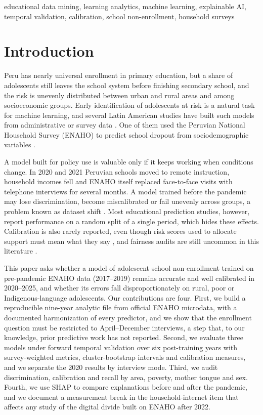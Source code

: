 \documentclass[conference]{IEEEtran}
\begin{document}
\begin{IEEEkeywords}
educational data mining, learning analytics, machine learning, explainable AI, temporal validation, calibration, school non-enrollment, household surveys
\end{IEEEkeywords}

\section{Introduction}

Peru has nearly universal enrollment in primary education, but a share of adolescents still leaves the school system before finishing secondary school, and the risk is unevenly distributed between urban and rural areas and among socioeconomic groups. Early identification of adolescents at risk is a natural task for machine learning, and several Latin American studies have built such models from administrative or survey data \cite{rodriguez2023,jacha2024,jimenez2024}. One of them used the Peruvian National Household Survey (ENAHO) to predict school dropout from sociodemographic variables \cite{jacha2024}.

A model built for policy use is valuable only if it keeps working when conditions change. In 2020 and 2021 Peruvian schools moved to remote instruction, household incomes fell and ENAHO itself replaced face-to-face visits with telephone interviews for several months. A model trained before the pandemic may lose discrimination, become miscalibrated or fail unevenly across groups, a problem known as dataset shift \cite{moreno2012}. Most educational prediction studies, however, report performance on a random split of a single period, which hides these effects. Calibration is also rarely reported, even though risk scores used to allocate support must mean what they say \cite{vancalster2019}, and fairness audits are still uncommon in this literature \cite{baker2022}.

This paper asks whether a model of adolescent school non-enrollment trained on pre-pandemic ENAHO data (2017--2019) remains accurate and well calibrated in 2020--2025, and whether its errors fall disproportionately on rural, poor or Indigenous-language adolescents. Our contributions are four. First, we build a reproducible nine-year analytic file from official ENAHO microdata, with a documented harmonization of every predictor, and we show that the enrollment question must be restricted to April--December interviews, a step that, to our knowledge, prior predictive work has not reported. Second, we evaluate three models under forward temporal validation over six post-training years with survey-weighted metrics, cluster-bootstrap intervals and calibration measures, and we separate the 2020 results by interview mode. Third, we audit discrimination, calibration and recall by area, poverty, mother tongue and sex. Fourth, we use SHAP to compare explanations before and after the pandemic, and we document a measurement break in the household-internet item that affects any study of the digital divide built on ENAHO after 2022.
\end{document}
